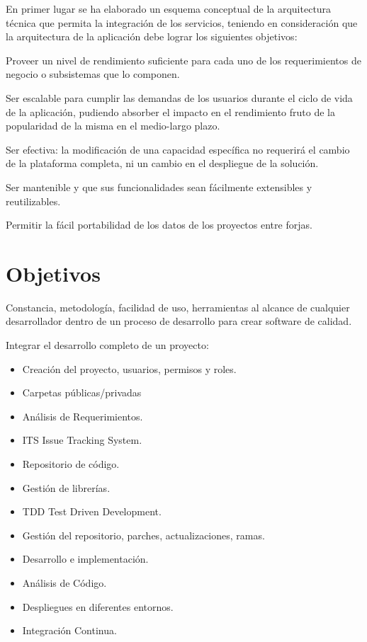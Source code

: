 \documentclass[a4paper, 12pt]{book}
\begin{document}
En primer lugar se ha elaborado un esquema conceptual de la arquitectura t\'ecnica que
permita la integraci\'on de los servicios, teniendo en consideraci\'on que la arquitectura de la
aplicaci\'on debe lograr los siguientes objetivos:

Proveer un nivel de rendimiento suficiente para cada uno de los requerimientos de
   negocio o subsistemas que lo componen.

Ser escalable para cumplir las demandas de los usuarios durante el ciclo de vida de la
   aplicaci\'on, pudiendo absorber el impacto en el rendimiento fruto de la popularidad de la
   misma en el medio-largo plazo.

Ser efectiva: la modificaci\'on de una capacidad espec\'ifica no requerir\'a el cambio de la
      plataforma completa, ni un cambio en el despliegue de la soluci\'on.

Ser mantenible y que sus funcionalidades sean f\'acilmente extensibles y reutilizables.

Permitir la f\'acil portabilidad de los datos de los proyectos entre forjas.


\chapter{Objetivos}
\label{chap:objetivos}

\par Constancia, metodolog\'ia, facilidad de uso, herramientas al alcance de cualquier desarrollador dentro de un proceso de desarrollo para crear software de calidad.

\par Integrar el desarrollo completo de un proyecto:

\begin{itemize}
	\item Creaci\'on del proyecto, usuarios, permisos y roles.
	\item Carpetas p\'ublicas/privadas
	\item An\'alisis de Requerimientos.
	\item ITS Issue Tracking System.
	\item Repositorio de c\'odigo.
	\item Gesti\'on de librer\'ias.
	\item TDD Test Driven Development.
	\item Gesti\'on del repositorio, parches, actualizaciones, ramas.
	\item Desarrollo e implementaci\'on.
	\item An\'alisis de C\'odigo.
	\item Despliegues en diferentes entornos.
	\item Integraci\'on Continua.
\end{itemize}
\end{document}
